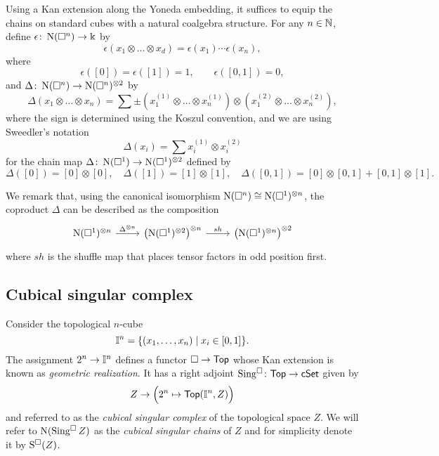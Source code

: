 Using a Kan extension along the Yoneda embedding, it suffices to equip the chains on standard cubes with a natural coalgebra structure.
For any $n \in \mathbb{N}$, define $\epsilon \colon \operatorname{N}(\square^n) \to \Bbbk$ by
\[
\epsilon \left( x_1 \otimes \dots \otimes x_d \right) = \epsilon(x_1) \dotsm \epsilon(x_n),
\]
where
\[
\epsilon([0]) = \epsilon([1]) = 1, \qquad \epsilon([0, 1]) = 0,
\] 
and $\Delta \colon \operatorname{N}(\square^n) \to \operatorname{N}(\square^n)^{\otimes 2}$ by
\[	
\Delta (x_1 \otimes \dots \otimes x_n) = 	
\sum \pm \left( x_1^{(1)} \otimes \dots \otimes x_n^{(1)} \right) \otimes 	
\left( x_1^{(2)} \otimes \dots \otimes x_n^{(2)} \right),	
\]	
where the sign is determined using the Koszul convention, and we are using Sweedler's notation
\[	
\Delta(x_i) = \sum x_i^{(1)} \otimes x_i^{(2)}
\]
for the chain map $\Delta \colon \operatorname{N}(\square^1) \to \operatorname{N}(\square^1)^{\otimes 2}$ defined by
\[
\Delta([0]) = [0] \otimes [0], \quad \Delta([1]) = [1] \otimes [1], \quad \Delta([0,1]) = [0] \otimes [0,1] + [0,1] \otimes [1].
\]

We remark that, using the canonical isomorphism $\operatorname{N}(\square^n) \cong \operatorname{N}(\square^1)^{\otimes n}$, the coproduct $\Delta$ can be described as the composition
\[
\begin{tikzcd}
\chains(\cube^1)^{\otimes n} \arrow[r, "\Delta^{\otimes n}"] & \left( \chains(\cube^1)^{\otimes 2}  \right)^{\otimes n} \arrow[r, "sh"] & \left( \chains(\cube^1)^{\otimes n} \right)^{\otimes 2}
\end{tikzcd}
\]
where $sh$ is the shuffle map that places tensor factors in odd position first.

\subsection{Cubical singular complex}

Consider the topological $n$-cube
\[
\mathbb{I}^{n} = \{(x_1, \dots, x_n) \mid x_i \in [0,1]\}.
\]
The assignment $2^n \to \mathbb{I}^n$ defines a functor $\square \to \mathsf{Top}$ whose Kan extension is known as \textit{geometric realization}.
It has a right adjoint $\operatorname{Sing^{\square}} \colon \mathsf{Top} \to \mathsf{cSet}$ given by
\[
Z \to \Big(2^n \mapsto \mathsf{Top}(\mathbb{I}^n, Z)\Big)
\]
and referred to as the \textit{cubical singular complex} of the topological space $Z$.
We will refer to $\operatorname{N}(\operatorname{Sing^{\square}} Z)$ as the \textit{cubical singular chains} of $Z$ and for simplicity denote it by $\operatorname{S^{\square}}(Z)$.